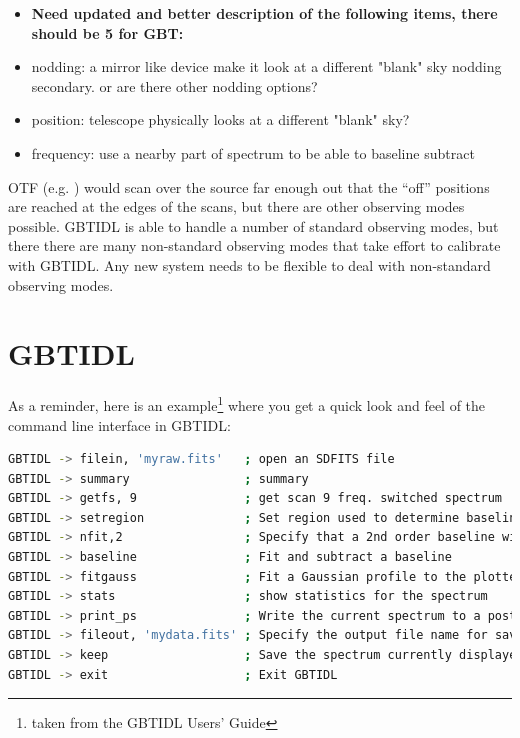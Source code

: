 \documentclass[12pt,a4paper]{article}
\begin{document}
\begin{itemize}
\item
  {\bf Need updated and better description of the following items, there should be 5 for GBT:}
\item
nodding:    a mirror like device make it look at a different "blank" sky
nodding secondary. or are there other nodding options?
\item
position:   telescope physically looks at a different "blank" sky?
\item
frequency:  use a nearby part of spectrum to be able to baseline subtract
\end{itemize}

OTF (e.g. \cite{2007AA...474..679M})
would scan over the source far enough out that the ``off'' positions are reached at
the edges of the scans, but there are other observing modes possible. GBTIDL is able to
handle a number of standard observing modes, but there there are many non-standard
observing modes that take effort to calibrate with GBTIDL.  Any new system needs to
be flexible to deal with non-standard observing modes.

\section{GBTIDL}

As a reminder, here is an example\footnote{taken from the GBTIDL Users' Guide}
where you get a quick look and feel of the command line interface in GBTIDL:

\begin{lstlisting}[language=bash]
% gbtidl                         # Start GBTIDL from the unix prompt
GBTIDL -> filein, 'myraw.fits'   ; open an SDFITS file
GBTIDL -> summary                ; summary
GBTIDL -> getfs, 9               ; get scan 9 freq. switched spectrum
GBTIDL -> setregion              ; Set region used to determine baseline (interactive)
GBTIDL -> nfit,2                 ; Specify that a 2nd order baseline will be used
GBTIDL -> baseline               ; Fit and subtract a baseline
GBTIDL -> fitgauss               ; Fit a Gaussian profile to the plotted spectrum.
GBTIDL -> stats                  ; show statistics for the spectrum
GBTIDL -> print_ps               ; Write the current spectrum to a postscript file
GBTIDL -> fileout, 'mydata.fits' ; Specify the output file name for saved data
GBTIDL -> keep                   ; Save the spectrum currently displayed
GBTIDL -> exit                   ; Exit GBTIDL

\end{lstlisting}
\end{document}
